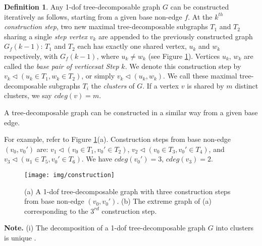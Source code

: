 \documentclass[secthm,amsthm,english]{article}
\theoremstyle{definition}
\newtheorem{definition}{Definition}
\theoremstyle{remark}
\begin{document}
\begin{definition}\label{def:td-construction} 
Any 1-dof tree-decomposable graph $G$ can be constructed iteratively as follows, starting from a given base non-edge $f$. 
At the $k^{th}$ {\emph{construction step}}, two new maximal tree-decomposable subgraphs
$T_{1}$ and $T_{2}$ sharing a single {\emph{step vertex}} $v_{k}$
are appended to the previously constructed graph $G_f(k-1)$: $T_{1}$
and $T_{2}$ each has exactly one shared vertex, $u_k$ and $w_k$ respectively, with $G_f(k-1)$, 
where $u_k \ne w_k$
(see Figure \ref{F:construction}). 
Vertices $u_k$, $w_k$ are called the {\emph{base pair of vertices}}{\emph{at Step}} $k$. 
We denote this construction
step by $v_{k}\triangleleft(u_k\in T_{1},w_k\in T_{2})$, or simply $v_{k}\triangleleft(u_k,w_k)$.
We call these maximal tree-decomposable subgraphs $T_i$ the {\emph{clusters}} of $G$. 
If a vertex $v$ is shared by $m$ distinct clusters, we say {$cdeg(v)=m$}. 

A tree-decomposable graph can be constructed in a similar way from a given base edge.
\end{definition}

For example, refer to Figure \ref{F:construction}(a). Construction steps
from base non-edge $(v_{0},v_{0}')$ are: $v_{1}\triangleleft(v_{0}\in T_{1},v_{0}'\in T_{2})$, $v_{2}\triangleleft(v_{0}\in T_{3},v_{0}'\in T_{4})$,
and $v_{3}\triangleleft(u_1\in T_{5},v_{0}'\in T_{6})$. 
We have $cdeg(v_0') = 3$, $cdeg(v_3) = 2$. 

\begin{figure}[h]
             
	
	\begin{centering}
	\texttt{[image: img/construction]} 
	\par\end{centering}
	
	\caption{ (a) A 1-dof tree-decomposable graph with three construction steps from base non-edge $(v_{0},v_{0}')$.
	(b) The extreme graph of (a) corresponding to the $3^{rd}$ construction step. 
	}

\label{F:construction} 
\end{figure}


\noindent\textbf{Note.} (i) The decomposition of a 1-dof tree-decomposable graph $G$ into clusters is unique \cite{bib:FudHo97proof}. 
\end{document}
